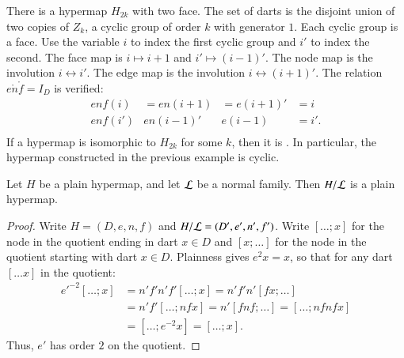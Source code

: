 \begin{example}[cyclic]\label{ex:H2k} 
There is a hypermap $H_{2k}$ with two face.  The set of darts is the
disjoint union of two copies of $Z_k$, a cyclic group of order $k$
with generator $1$.  Each cyclic group is a face.  Use the variable
$i$ to index the first cyclic group and $i'$ to index the second.
The face map is $i\mapsto i+1$ and $i'\mapsto (i-1)'$.  The node map
is the involution $i\leftrightarrow i'$.  The edge map is the
involution $i\leftrightarrow (i+1)'$.  The relation $e\ocirc n\ocirc
f = I_D$ is verified:
\begin{displaymath}
\begin{array}{llllllll}
enf(i) &= e n(i+1) &= e(i+1)' &= i\\
e n f (i') & e n (i-1)' & e (i-1) &= i'.\\
\end{array}
\end{displaymath}
If a hypermap is isomorphic to $H_{2k}$ for
some $k$, then it is .  In particular,
the hypermap constructed in the previous example is cyclic.
%
%
\end{example}

\begin{lemma}
Let $H$ be a plain hypermap, and let $\cal L$ be a
normal family.  Then $H/{\cal L}$ is a plain hypermap.
\end{lemma}

\begin{proof}  Write $H=(D,e,n,f)$ and $H/{\cal L} = (D',e',n',f')$.  
Write $[\ldots; x]$ for the node in
the quotient ending in dart $x\in D$ and $[x;\ldots]$ for the node
in the quotient starting with dart $x\in D$.  Plainness gives $e^2 x
= x$, so that for any dart $[\ldots x]$ in the quotient:
\begin{displaymath}\begin{array}{lll}
{e'}^{-2} [\ldots; x] &= n' f' n' f' [\ldots; x] = n' f' n' [f x; \ldots] \\&=
n' f' [\ldots; n f x] = n' [f n f; \ldots] = [\ldots; n f n f x]\\ &=
[\ldots; e^{-2} x] = [\ldots; x].
\end{array}\end{displaymath}
Thus, $e'$ has order $2$ on the quotient.
\end{proof}

%


